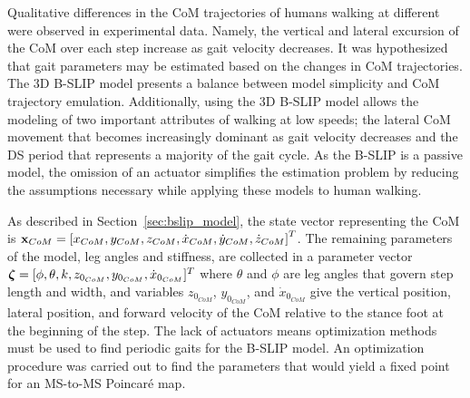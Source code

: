 Qualitative differences in the CoM trajectories of humans walking at different were observed in experimental data. Namely, the vertical and lateral excursion of the CoM over each step increase as gait velocity decreases. It was hypothesized that gait parameters may be estimated based on the changes in CoM trajectories. The 3D B-SLIP model presents a balance between model simplicity and CoM trajectory emulation. Additionally, using the 3D B-SLIP model allows the modeling of two important attributes of walking at low speeds; the lateral CoM movement that becomes increasingly dominant as gait velocity decreases and the DS period that represents a majority of the gait cycle. As the B-SLIP is a passive model, the omission of an actuator simplifies the estimation problem by reducing the assumptions necessary while applying these models to human walking. 

As described in Section~\ref{sec:bslip_model}, the state vector representing the CoM is $ \mathbf{x}_{CoM} = \left[x_{CoM} ,y_{CoM} ,z_{CoM} ,\dot{x}_{CoM} ,\dot{y}_{CoM} ,\dot{z}_{CoM}\right]^T $. The remaining parameters of the model, leg angles and stiffness, are collected in a parameter vector $ \boldsymbol{\zeta} = [\phi, \theta ,k ,z_{0_{CoM}} ,y_{0_{CoM}} ,\dot{x}_{0_{CoM}}]^T $ where $ \theta $ and $ \phi $ are leg angles that govern step length and width, and variables $ z_{0_{CoM}}$, $y_{0_{CoM}}$, and $\dot{x}_{0_{CoM}} $ give the vertical position, lateral position, and forward velocity of the CoM relative to the stance foot at the beginning of the step. The lack of actuators means optimization methods must be used to find periodic gaits for the B-SLIP model. An optimization procedure was carried out to find the parameters that would yield a fixed point for an MS-to-MS Poincar\'e map.

